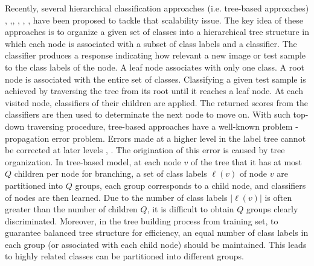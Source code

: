 \documentclass[review]{elsarticle}
\begin{document}
Recently, several hierarchical classification approaches (i.e. tree-based approaches) \cite{Bengio.NIPS2010}, \cite{Deng.NIPS2011},\cite{WangICME13}, \cite{Liu.CVPR2013.ProbTree}, \cite{Zhu.CVIU2014}, \cite{SunICCV2013}, \cite{Babbar.NIPS2013_5082} have been proposed to tackle that scalability issue. 
The key idea of these approaches is to organize a given set of classes into a hierarchical tree structure in which each node is associated with a subset of class labels and a classifier. The classifier produces a response indicating how relevant a new image or test sample to the class labels of the node. A leaf node associates with only one class. A root node is associated with the entire set of classes.
Classifying a given test sample is achieved by traversing the tree from its root until it reaches a leaf node. 
At each visited node, classifiers of their children are applied. The returned scores from the classifiers are then used to determinate the next node to move on.  
With such top-down traversing procedure, tree-based approaches have a well-known problem - propagation error problem. Errors made at a higher level in the label tree cannot be corrected at later levels \cite{Liu.CVPR2013.ProbTree}, \cite{Zhu.CVIU2014}. 
The origination of this error is caused by tree organization. In tree-based model, at each node $v$ of the tree that it has at most $Q$ children per node for branching, a set of class labels $\ell(v)$ of node $v$ are partitioned into $Q$ groups, each group corresponds to a child node, and classifiers of nodes are then learned. Due to the number of class labels $|\ell(v)|$ is often greater than the number of children $Q$, it is difficult to obtain $Q$ groups clearly discriminated. 
Moreover, in the tree building process from training set, to guarantee balanced tree structure for efficiency, an equal number of class labels in each group (or associated with each child node) should be maintained. This leads to highly related classes can be partitioned into different groups. 
\end{document}
